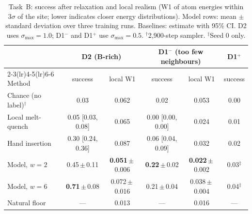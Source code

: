 \documentclass[10pt]{article}
\newcommand{\Dm}{D1$^{-}$}
\newcommand{\Dp}{D1$^{+}$}
\newcommand{\pmsd}[2]{#1\,{\scriptsize$\pm$\,#2}}
\begin{document}
\begin{table}[!tb]
\centering
\caption{Task~B: success after relaxation and local realism (W1 of atom energies within $3\sigma$ of the site; lower indicates closer energy distributions). Model rows: mean $\pm$ standard deviation over three training runs. Baselines: estimate with 95\% CI. D2 uses $\sigma_\text{max}=1.0$; \Dm{} and \Dp{} use $\sigma_\text{max}=0.5$. $^\dagger$2{,}900-step sampler. $^\ddagger$Seed 0 only.}
\label{tab:main}
\small
\setlength{\tabcolsep}{4pt}
\begin{tabular}{lccccc}
\toprule
& \multicolumn{2}{c}{D2 (B-rich)} & \multicolumn{2}{c}{\Dm{} (too few neighbours)} & \Dp{} \\
\cmidrule(lr){2-3}\cmidrule(lr){4-5}\cmidrule(lr){6-6}
Method & success & local W1 & success & local W1 & success \\
\midrule
Chance (no label)$^\dagger$ & 0.03 & 0.062 & 0.02 & 0.053 & 0.00 \\
Local melt-quench & 0.05 {\scriptsize[0.03, 0.08]} & 0.065 & 0.00 {\scriptsize[0.00, 0.00]} & 0.024 & 0.01 \\
Hand insertion & 0.30 {\scriptsize[0.24, 0.36]} & 0.087 & 0.06 {\scriptsize[0.04, 0.09]} & 0.032 & 0.02 \\
\midrule
Model, $w=2$ & \pmsd{0.45}{0.11} & \pmsd{\textbf{0.051}}{0.006} & \pmsd{\textbf{0.22}}{0.02} & \pmsd{\textbf{0.022}}{0.002} & 0.03$^\ddagger$ \\
Model, $w=6$ & \pmsd{\textbf{0.71}}{0.08} & \pmsd{0.072}{0.016} & \pmsd{0.21}{0.04} & \pmsd{0.038}{0.004} & 0.04$^\ddagger$ \\
\midrule
Natural floor & --- & 0.013 & --- & 0.016 & --- \\
\bottomrule
\end{tabular}
\end{table}
\end{document}
